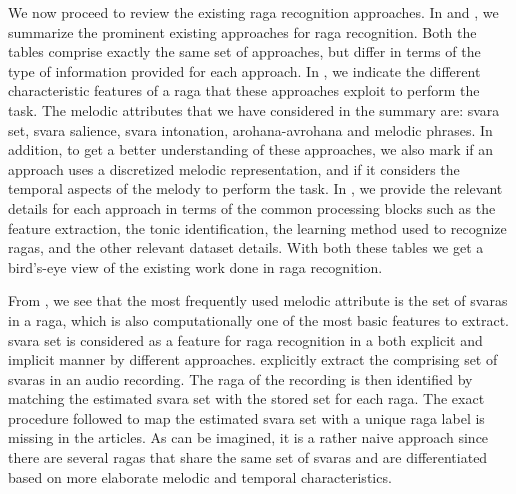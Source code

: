 We now proceed to review the existing \gls{raga} recognition approaches. In  and , we summarize the prominent existing approaches for \gls{raga} recognition. Both the tables comprise exactly the same set of approaches, but differ in terms of the type of information provided for each approach. In , we indicate the different characteristic features of a \gls{raga} that these approaches exploit to perform the task. The melodic attributes that we have considered in the summary are: \gls{svara} set, \gls{svara} salience, \gls{svara} intonation, \gls{arohana}-\gls{avrohana} and melodic phrases. In addition, to get a better understanding of these approaches, we also mark if an approach uses a discretized melodic representation, and if it considers the temporal aspects of the melody to perform the task. In , we provide the relevant details for each approach in terms of the common processing blocks such as the feature extraction, the tonic identification, the learning method used to recognize \glspl{raga}, and the other relevant dataset details. With both these tables we get a bird's-eye view of the existing work done in \gls{raga} recognition.

From , we see that the most frequently used melodic attribute is the set of \glspl{svara} in a \gls{raga}, which is also computationally one of the most basic features to extract. \Gls{svara} set is considered as a feature for \gls{raga} recognition in a both explicit and implicit manner by different approaches. \cite{chakraborty2012object,ranjani2011carnatic} explicitly extract the comprising set of \glspl{svara} in an audio recording. The \gls{raga} of the recording is then identified by matching the estimated \gls{svara} set with the stored set for each \gls{raga}. The exact procedure followed to map the estimated \gls{svara} set with a unique \gls{raga} label is missing in the articles. As can be imagined, it is a rather naive approach since there are several \glspl{raga} that share the same set of \glspl{svara} and are differentiated based on more elaborate melodic and temporal characteristics.

